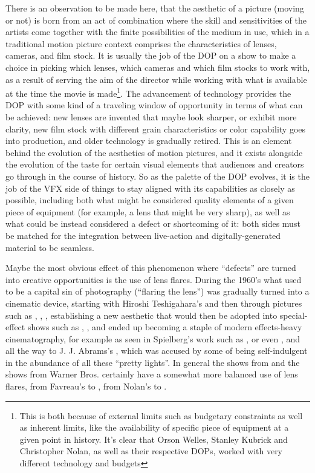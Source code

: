 There is an observation to be made here, that the aesthetic of a picture (moving or not) is born from
an act of combination where the skill and sensitivities of the artists come together with the 
finite possibilities of the medium in use, which in a traditional motion picture context comprises 
the characteristics of lenses, cameras, and film stock. 
It is usually the job of the \gls{DOP} on a show to make a choice in picking which lenses, which cameras 
and which film stocks to work with, as a result of serving the aim of the director while working with 
what is available at the time the movie is made\footnote{This is both because of external limits such as 
	budgetary constraints as well as inherent limits, like the availability of specific piece of equipment 
	at a given point in history. It's clear that Orson Welles, Stanley Kubrick and Christopher Nolan, 
	as well as their respective \glspl{DOP}, worked with very different technology and budgets}. 
The advancement of technology provides the \gls{DOP} with some kind of a traveling 
window of opportunity in terms of what can be achieved: new lenses are invented that maybe look sharper,
or exhibit more clarity, new film stock with different grain characteristics or color capability goes into
production, and older technology is gradually retired.
This is an element behind the evolution of the aesthetics of motion pictures, and it exists alongside the
evolution of the taste for certain visual elements that audiences and creators go through in the course of
history.
So as the palette of the \gls{DOP} evolves, it is the job of the \gls{VFX} side of things to stay
aligned with its capabilities as closely as possible, including both what might be considered
quality elements of a given piece of equipment (for example, a lens that might be very sharp),
as well as what could be instead considered a defect or shortcoming of it: both sides must be
matched for the integration between live-action and digitally-generated material to be seamless. 

Maybe the most obvious effect of this phenomenon where ``defects'' are turned into creative opportunities is
the use of lens flares. 
During the 1960's what used to be a capital sin of photography (``flaring the lens'') was gradually
turned into a cinematic device, starting with Hiroshi Teshigahara's \cite{teshigahara64} and then through pictures 
such as \cite{graduate67}, \cite{easyrider69}, \cite{fiveeasypieces70}, 
establishing a new aesthetic that would then be adopted into special-effect shows such as \cite{spaceodyssey68}, 
\cite{starwars77}, \cite{closeencounters77} and ended up becoming a staple of modern effects-heavy 
cinematography, for example as seen in Spielberg's work such as \cite{raiders81}, \cite{et82} or even
\cite{goonies85}, and all the way to J. J. Abrams's \cite{startrek2013}, which was accused by some
of being self-indulgent in the abundance of all these ``pretty lights''. 
In general the shows from  and the  shows from
Warner Bros. certainly have a somewhat more balanced use of lens flares, from Favreau's 
\cite{ironman08} to \cite{avengers_eg}, from Nolan's \cite{darkknight08} to \cite{blackadam22}.


